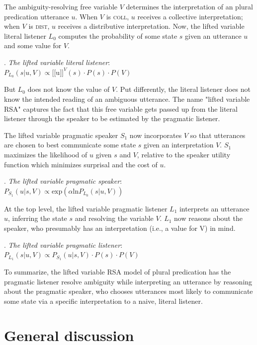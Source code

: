 \documentclass[linguex]{sp}
\newcommand{\sem}[1]{\mbox{$[\![$#1$]\!]$}}
\begin{document}
The ambiguity-resolving free variable $V$ determines the interpretation of an plural predication utterance $u$. When $V$ is \textsc{coll}, $u$ receives a collective interpretation; when $V$ is \textsc{dist}, $u$ receives a distributive interpretation. Now, the lifted variable literal listener $L_{0}$ computes the probability of some state $s$ given an utterance $u$ and some value for $V$. 

\ex. \emph{The lifted variable literal listener}:\\
$P_{L_{0}}(s|u,V) \propto \sem{u}^{V}(s) \cdot P(s) \cdot P(V)$

But $L_{0}$ does not know the value of $V$. Put differently, the literal listener does not know the intended reading of an ambiguous utterance. The name "lifted variable RSA" captures the fact that this free variable gets passed up from the literal listener through the speaker to be estimated by the pragmatic listener.

The lifted variable pragmatic speaker $S_{1}$ now incorporates $V$ so that utterances are chosen to best communicate some state $s$ given an interpretation $V$. $S_{1}$ maximizes the likelihood of $u$ given $s$ and $V$, relative to the speaker utility function which minimizes surprisal and the cost of $u$.

\ex. \emph{The lifted variable pragmatic speaker}:\\
$P_{S_{1}}(u|s,V) \propto \textrm{exp}(\alpha\textrm{ln}P_{L_{0}}(s|u,V))$

At the top level, the lifted variable pragmatic listener $L_{1}$ interprets an utterance $u$, inferring the state $s$ and resolving the variable $V$. $L_{1}$ now reasons about the speaker, who presumably has an interpretation (i.e., a value for V) in mind.

\ex. \emph{The lifted variable pragmatic listener}:\\
$P_{L_{1}}(s|u,V) \propto P_{S_{1}}(u|s,V) \cdot P(s) \cdot P(V)$

To summarize, the lifted variable RSA model of plural predication has the pragmatic listener resolve ambiguity while interpreting an utterance by reasoning about the pragmatic speaker, who chooses utterances most likely to communicate some state via a specific interpretation to a naive, literal listener.


\section{General discussion}
\end{document}
